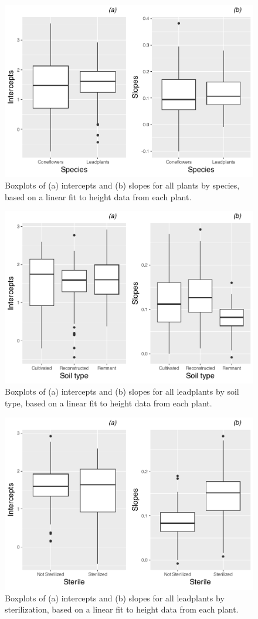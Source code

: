 \documentclass[
]{krantz}
\begin{document}
\begin{figure}

{\centering \includegraphics[width=0.6\linewidth]{bookdown-BeyondMLR_files/figure-latex/irboxbyspec-1} 

}

\caption{Boxplots of (a) intercepts and (b) slopes for all plants by species, based on a linear fit to height data from each plant.}\label{fig:irboxbyspec}
\end{figure}

\begin{figure}

{\centering \includegraphics[width=0.6\linewidth]{bookdown-BeyondMLR_files/figure-latex/irboxbysoil-1} 

}

\caption{Boxplots of (a) intercepts and (b) slopes for all leadplants by soil type, based on a linear fit to height data from each plant.}\label{fig:irboxbysoil}
\end{figure}

\begin{figure}

{\centering \includegraphics[width=0.6\linewidth]{bookdown-BeyondMLR_files/figure-latex/irboxbyster-1} 

}

\caption{Boxplots of (a) intercepts and (b) slopes for all leadplants by sterilization, based on a linear fit to height data from each plant.}\label{fig:irboxbyster}
\end{figure}
\end{document}
